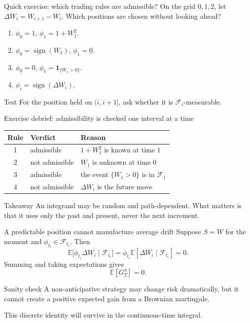 \documentclass[10pt,aspectratio=169]{beamer}
\newcommand{\E}{\mathbb E}
\newcommand{\F}{\mathcal F}
\begin{document}
\begin{frame}{Quick exercise: which trading rules are admissible?}
On the grid \(0,1,2\), let \(\Delta W_i=W_{i+1}-W_i\). Which positions are chosen without looking ahead?
\begin{enumerate}\setlength{\itemsep}{0.75em}
  \item \(\phi_0=1\), \(\phi_1=1+W_1^2\).
  \item \(\phi_0=\operatorname{sign}(W_1)\), \(\phi_1=0\).
  \item \(\phi_0=0\), \(\phi_1=\mathbf 1_{\{W_1>0\}}\).
  \item \(\phi_i=\operatorname{sign}(\Delta W_i)\).
\end{enumerate}
\begin{block}{Test}
For the position held on \((i,i+1]\), ask whether it is \(\F_i\)-measurable.
\end{block}
\end{frame}

\begin{frame}{Exercise debrief: admissibility is checked one interval at a time}
\begin{center}
\begin{tabular}{cll}
\toprule
Rule & Verdict & Reason \\
\midrule
1 & admissible & \(1+W_1^2\) is known at time \(1\) \\
2 & not admissible & \(W_1\) is unknown at time \(0\) \\
3 & admissible & the event \(\{W_1>0\}\) is in \(\F_1\) \\
4 & not admissible & \(\Delta W_i\) is the future move \\
\bottomrule
\end{tabular}
\end{center}
\begin{block}{Takeaway}
An integrand may be random and path-dependent. What matters is that it uses only the past and present, never the next increment.
\end{block}
\end{frame}

\begin{frame}{A predictable position cannot manufacture average drift}
Suppose \(S=W\) for the moment and \(\phi_{t_i}\in\F_{t_i}\). Then
\[
\E\bigl[\phi_{t_i}\Delta W_i\mid\F_{t_i}\bigr]
=\phi_{t_i}\E[\Delta W_i\mid\F_{t_i}]=0.
\]
Summing and taking expectations gives
\[
\E[G_T^\pi]=0.
\]
\begin{block}{Sanity check}
A non-anticipative strategy may change risk dramatically, but it cannot create a positive expected gain from a Brownian martingale.
\end{block}
This discrete identity will survive in the continuous-time integral.
\end{frame}
\end{document}
